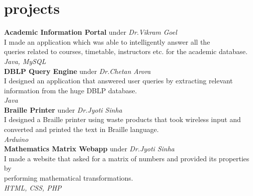 \documentclass[]{friggeri-cv}
\begin{document}
\section{projects}

\begin{entrylist}
    \vspace{0.5em}
    {\textbf{Academic Information Portal }}{under \em {Dr.Vikram Goel}}\\
    I made an application which was able to intelligently answer all the\\
    queries related to courses, timetable, instructors etc. for the academic database.\\
    \vspace{0.5em}
    {\em{Java, MySQL}}\\
    {\textbf{DBLP Query Engine }}{under \em{Dr.Chetan Arora}}\\
    I designed an application that answered user queries by extracting relevant\\
    information from the huge DBLP database.\\
    \vspace{0.5em}
    {\em{Java}}\\
    {\textbf{Braille Printer }}{under \em{Dr.Jyoti Sinha}}\\
    I designed a Braille printer using waste products that took wireless input and\\
    converted and printed the text in Braille language.\\
    \vspace{0.5em}
    {\em{Arduino}}\\
    {\textbf{Mathematics Matrix Webapp }}{under \em{Dr.Jyoti Sinha}}\\
    I made a website that asked for a matrix of numbers and provided its properties by\\
    performing mathematical transformations.\\
    \vspace{0.5em}
    {\em{HTML, CSS, PHP}}


\end{entrylist}
\\\\\\\\\\\\\\\\\\\\
\end{document}
